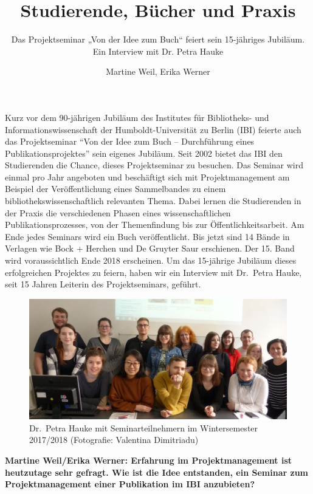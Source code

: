 \documentclass[a4paper,
fontsize=11pt,
oneside,
numbers=noperiodatend,
parskip=half-,
bibliography=totoc,
final
]{scrartcl}
\title{\LARGE{Studierende, Bücher und Praxis}}%
\subtitle{Das Projektseminar „Von der Idee zum Buch“ feiert sein 15-jähriges Jubiläum. Ein Interview mit Dr. Petra Hauke}
\author{Martine Weil, Erika Werner} %
\date{}
\begin{document}
\maketitle
\thispagestyle{fancyplain} 


Kurz vor dem 90-jährigen Jubiläum des Institutes für Bibliotheks- und
Informationswissenschaft der Humboldt-Universität zu Berlin (IBI)
feierte auch das Projektseminar \enquote{Von der Idee zum Buch --
Durchführung eines Publikationsprojektes} sein eigenes Jubiläum. Seit
2002 bietet das IBI den Studierenden die Chance, dieses Projektseminar
zu besuchen. Das Seminar wird einmal pro Jahr angeboten und beschäftigt
sich mit Projektmanagement am Beispiel der Veröffentlichung eines
Sammelbandes zu einem bibliothekswissenschaftlich relevanten Thema.
Dabei lernen die Studierenden in der Praxis die verschiedenen Phasen
eines wissenschaftlichen Publikationsprozesses, von der Themenfindung
bis zur Öffentlichkeitsarbeit. Am Ende jedes Seminars wird ein Buch
veröffentlicht. Bis jetzt sind 14 Bände in Verlagen wie Bock + Herchen
und De Gruyter Saur erschienen. Der 15. Band wird voraussichtlich Ende
2018 erscheinen. Um das 15-jährige Jubiläum dieses erfolgreichen
Projektes zu feiern, haben wir ein Interview mit Dr.~Petra Hauke, seit
15 Jahren Leiterin des Projektseminars, geführt.

\begin{figure}[h!]
\centering
\includegraphics[width=15cm]{img/Bild-01.jpg}
\caption{Dr.~Petra Hauke mit Seminarteilnehmern im Wintersemester
2017/2018 (Fotografie: Valentina Dimitriadu)}
\end{figure}

\pagebreak

\textbf{Martine Weil/Erika Werner: Erfahrung im Projektmanagement ist
heutzutage sehr gefragt. Wie ist die Idee entstanden, ein Seminar zum
Projektmanagement einer Publikation im IBI anzubieten?}
\end{document}

